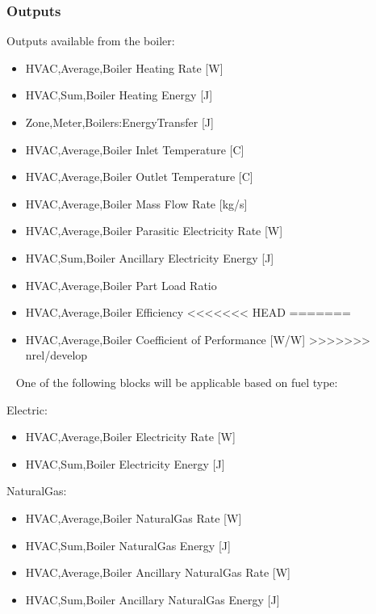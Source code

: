 \subsubsection{Outputs}\label{outputs-10-005}

Outputs available from the boiler:

\begin{itemize}
    \item
    HVAC,Average,Boiler Heating Rate {[}W{]}
    \item
    HVAC,Sum,Boiler Heating Energy {[}J{]}
    \item
    Zone,Meter,Boilers:EnergyTransfer {[}J{]}
    \item
    HVAC,Average,Boiler Inlet Temperature {[}C{]}
    \item
    HVAC,Average,Boiler Outlet Temperature {[}C{]}
    \item
    HVAC,Average,Boiler Mass Flow Rate {[}kg/s{]}
    \item
    HVAC,Average,Boiler Parasitic Electricity Rate {[}W{]}
    \item
    HVAC,Sum,Boiler Ancillary Electricity Energy {[}J{]}
    \item
    HVAC,Average,Boiler Part Load Ratio
    \item
    HVAC,Average,Boiler Efficiency
<<<<<<< HEAD
=======
    \item
    HVAC,Average,Boiler Coefficient of Performance {[}W/W{]}
>>>>>>> nrel/develop
\end{itemize}

~ One of the following blocks will be applicable based on fuel type:

Electric:

\begin{itemize}
    \item
    HVAC,Average,Boiler Electricity Rate {[}W{]}
    \item
    HVAC,Sum,Boiler Electricity Energy {[}J{]}
\end{itemize}

NaturalGas:

\begin{itemize}
    \item
    HVAC,Average,Boiler NaturalGas Rate {[}W{]}
    \item
    HVAC,Sum,Boiler NaturalGas Energy {[}J{]}
    \item
    HVAC,Average,Boiler Ancillary NaturalGas Rate {[}W{]}
    \item
    HVAC,Sum,Boiler Ancillary NaturalGas Energy {[}J{]}
\end{itemize}

